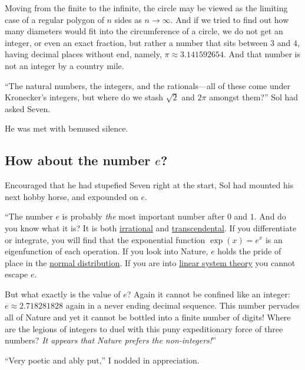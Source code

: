 \documentclass[
  a4paper,
]{article}
\begin{document}
Moving from the finite to the infinite, the circle may be viewed as the
limiting case of a regular polygon of \(n\) sides as \(n \to \infty\).
And if we tried to find out how many diameters would fit into the
circumference of a circle, we do not get an integer, or even an exact
fraction, but rather a number that sits between \(3\) and \(4\), having
decimal places without end, namely, \(\pi \approx 3.141592654\). And
that number is not an integer by a country mile.

``The natural numbers, the integers, and the rationals---all of these
come under Kronecker's integers, but where do we stash \(\sqrt{2}\) and
\(2\pi\) amongst them?'' Sol had asked Seven.

He was met with bemused silence.

\subsection{\texorpdfstring{How about the number
\(e\)?}{How about the number e?}}\label{how-about-the-number-e}

Encouraged that he had stupefied Seven right at the start, Sol had
mounted his next hobby horse, and expounded on \(e\).

``The number \(e\) is probably \emph{the} most important number after
\(0\) and \(1\). And do you know what it is? It is both
\href{https://mathworld.wolfram.com/IrrationalNumber.html}{irrational}
and
\href{https://en.wikipedia.org/wiki/Transcendental_number}{transcendental}.
If you differentiate or integrate, you will find that the exponential
function \(\exp(x) = e^x\) is an eigenfunction of each operation. If you
look into Nature, \(e\) holds the pride of place in the
\href{https://www.khanacademy.org/math/statistics-probability/modeling-distributions-of-data/normal-distributions-library/a/normal-distributions-review}{normal
distribution}. If you are into
\href{https://www.cns.nyu.edu/~david/handouts/linear-systems/linear-systems.html}{linear
system theory} you cannot escape \(e\).

But what exactly is the value of \(e\)? Again it cannot be confined like
an integer: \(e \approx 2.718281828\) again in a never ending decimal
sequence. This number pervades all of Nature and yet it cannot be
bottled into a finite number of digits! Where are the legions of
integers to duel with this puny expeditionary force of three numbers?
\emph{It appears that Nature prefers the non-integers!}''

``Very poetic and ably put,'' I nodded in appreciation.
\end{document}
